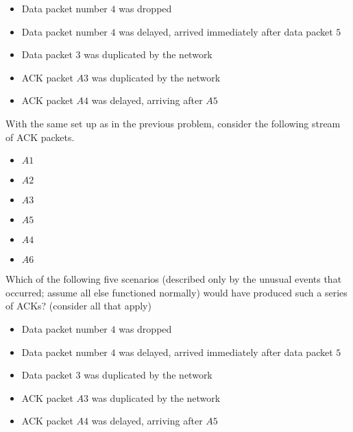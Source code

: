 \documentclass{supervision}
\begin{document}
\begin{questions}
\begin{parts}
\begin{subparts}
                \begin{itemize}
                  \item Data packet number $4$ was dropped
                  \item Data packet number $4$ was delayed, arrived immediately
                    after data packet $5$
                  \item Data packet $3$ was duplicated by the network
                  \item ACK packet $A3$ was duplicated by the network
                  \item ACK packet $A4$ was delayed, arriving after $A5$
                \end{itemize}

              \subpart With the same set up as in the previous problem,
                consider the following stream of ACK packets.

                \begin{itemize}
                  \item $A1$
                  \item $A2$
                  \item $A3$
                  \item $A5$
                  \item $A4$
                  \item $A6$
                \end{itemize}

                Which of the following five scenarios (described only by the
                unusual events that occurred; assume all else functioned
                normally) would have produced such a series of ACKs? (consider
                all that apply)

                \begin{itemize}
                  \item Data packet number $4$ was dropped
                  \item Data packet number $4$ was delayed, arrived immediately
                  after data packet $5$
                  \item Data packet $3$ was duplicated by the network
                  \item ACK packet $A3$ was duplicated by the network
                  \item ACK packet $A4$ was delayed, arriving after $A5$
                \end{itemize}


\end{subparts}
\end{parts}
\end{questions}
\end{document}
